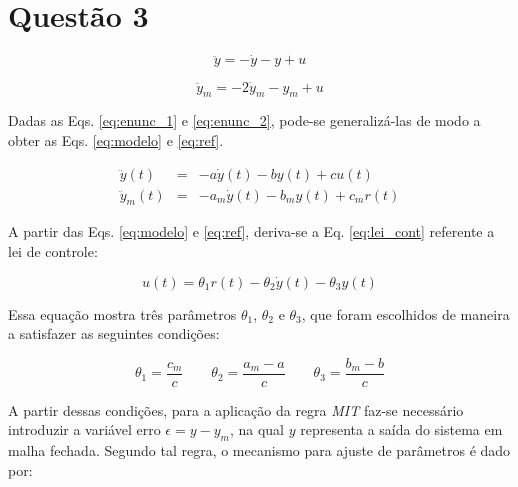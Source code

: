 \section*{Questão 3}

\begin{equation}\label{eq:enunc_1}
\ddot{y} = -\dot{y} - y  + u 
\end{equation}


\begin{equation}\label{eq:enunc_2}
\ddot{y}_m = -2\dot{y}_m - y_m  + u
\end{equation}


\vspace{0.5cm}


\vspace{0.25cm}

Dadas as Eqs. \ref{eq:enunc_1} e \ref{eq:enunc_2}, pode-se generalizá-las de
modo a obter as Eqs. \ref{eq:modelo} e \ref{eq:ref}.

\begin{eqnarray}
\ddot{y}(t) & = &-a\dot{y}(t) - by(t) + cu(t) \label{eq:modelo}\\
\ddot{y}_m(t) & = &-a_m\dot{y}(t) - b_my(t) + c_mr(t) \label{eq:ref}
\end{eqnarray}

A partir das Eqs. \ref{eq:modelo} e \ref{eq:ref}, deriva-se a Eq.
\ref{eq:lei_cont} referente a lei de controle:

\begin{equation}\label{eq:lei_cont}
u(t) = \theta_1r(t) - \theta_2\dot{y}(t) - \theta_3y(t)
\end{equation}

Essa equação mostra três parâmetros $\theta_1$, $\theta_2$ e $\theta_3$, que
foram escolhidos de maneira a satisfazer as seguintes condições:

\begin{equation}
\theta_1 = \frac{c_m}{c}
\qquad
\theta_2 = \frac{a_m - a}{c}
\qquad
\theta_3 = \frac{b_m - b}{c}
\end{equation}

A partir dessas condições, para a aplicação da regra {\it MIT} faz-se necessário
introduzir a variável erro $\epsilon = y - y_m$, na qual $y$ representa a saída
do sistema em malha fechada. Segundo tal regra, o mecanismo para ajuste de
parâmetros é dado por:


